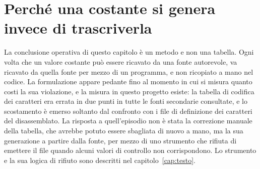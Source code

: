 \section{Perché una costante si genera invece di trascriverla}

La conclusione operativa di questo capitolo è un metodo e non una tabella. Ogni volta che un valore costante può essere ricavato da una fonte autorevole, va ricavato da quella fonte per mezzo di un programma, e non ricopiato a mano nel codice. La formulazione appare pedante fino al momento in cui si misura quanto costi la sua violazione, e la misura in questo progetto esiste: la tabella di codifica dei caratteri era errata in due punti in tutte le fonti secondarie consultate, e lo scostamento è emerso soltanto dal confronto con i file di definizione dei caratteri del disassemblato. La risposta a quell'episodio non è stata la correzione manuale della tabella, che avrebbe potuto essere sbagliata di nuovo a mano, ma la sua generazione a partire dalla fonte, per mezzo di uno strumento che rifiuta di emettere il file quando alcuni valori di controllo non corrispondono. Lo strumento e la sua logica di rifiuto sono descritti nel capitolo~\ref{cap:testo}.
